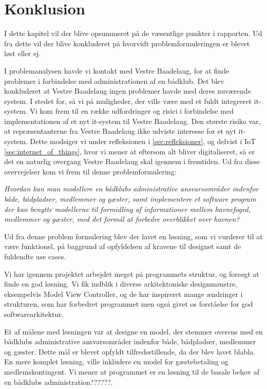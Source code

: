 \chapter{Konklusion}
\label{cha:konklusion}
I dette kapitel vil der blive opsummeret på de væsentlige punkter i rapporten. Ud fra dette vil der blive konkluderet på hvorvidt problemformuleringen er blevet løst eller ej.

I problemanalysen havde vi kontakt med Vestre Baadelaug, for at finde problemer i forbindelse med administrationen af en bådklub. Det blev konkluderet at Vestre Baadelaug ingen problemer havde med deres nuværende system. I stedet for, så vi på muligheder, der ville være med et fuldt integreret it-system. Vi kom frem til en række udfordringer og risici i forbindelse med implementationen af et nyt it-system til Vestre Baadelaug. Den største risiko var, at repræsentanterne fra Vestre Baadelaug ikke udviste interesse for et nyt it-system. Dette modsiger vi under refleksionen i \cref{sec:refleksioner}, og delvist i IoT \cref{sec:internet_of_things}, hvor vi mener at eftersom alt bliver digitaliseret, så er det en naturlig overgang Vestre Baadelaug skal igennem i fremtiden. Ud fra disse overvejelser kom vi frem til denne problemformulering:

\begin{displayquote}
\textit{Hvordan kan man modellere en bådklubs administrative ansvarsområder indenfor både, bådpladser, medlemmer og gæster, samt implementere et software program der kan benytte modellerne til formidling af informationer mellem havnefoged, medlemmer og gæster, med det formål at forbedre overblikket over havnen?}
\end{displayquote}

Ud fra denne problem formulering blev der lavet en løsning, som vi vurderer til at være funktionel, på baggrund af opfyldelsen af kravene til designet samt de fuldendte use cases.

Vi har igennem projektet arbejdet meget på programmets struktur, og forsøgt at finde en god løsning. Vi fik indblik i diverse arkitektoniske designmønstre, eksempelvis Model View Controller, og de har inspireret mange ændringer i strukturen, som har forbedret programmet men også givet os forståelse for god softwarearkitektur.


Et af målene med løsningen var at designe en model, der stemmer overens med en bådklubs administrative ansvarsområder indenfor både, bådpladser, medlemmer og gæster. Dette mål er blevet opfyldt tilfredsstillende, da der blev lavet blabla. En mere komplet løsning, ville inkludere en model for gæstebetaling og medlemskontingent. Vi mener at programmet er en løsning til de basale behov af en bådklubs administration??????.

